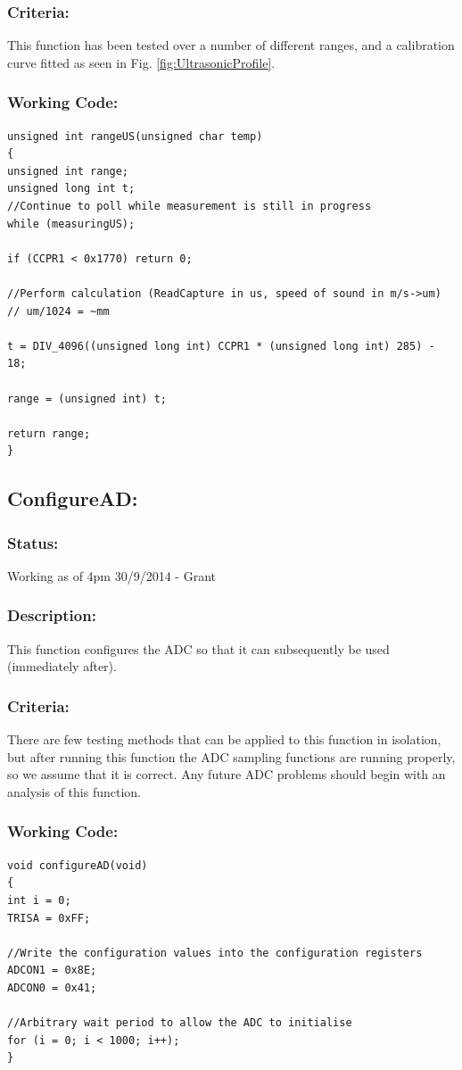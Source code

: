 \documentclass[]{report}
\begin{document}
\subsubsection{Criteria:}
This function has been tested over a number of different ranges, and a calibration curve fitted as seen in Fig. \ref{fig:UltrasonicProfile}.

\subsubsection{Working Code:}
\begin{lstlisting}
unsigned int rangeUS(unsigned char temp)
{
unsigned int range;
unsigned long int t;
//Continue to poll while measurement is still in progress
while (measuringUS);

if (CCPR1 < 0x1770) return 0;

//Perform calculation (ReadCapture in us, speed of sound in m/s->um)
// um/1024 = ~mm

t = DIV_4096((unsigned long int) CCPR1 * (unsigned long int) 285) - 18;

range = (unsigned int) t;

return range;
}
\end{lstlisting}


\subsection{ConfigureAD:}
\subsubsection{Status:}
Working as of 4pm 30/9/2014 - Grant

\subsubsection{Description:}
This function configures the ADC so that it can subsequently be used (immediately after).

\subsubsection{Criteria:}
There are few testing methods that can be applied to this function in isolation, but after running this function the ADC sampling functions are running properly, so we assume that it is correct. Any future ADC problems should begin with an analysis of this function.

\subsubsection{Working Code:}
\begin{lstlisting}
void configureAD(void)
{
int i = 0;
TRISA = 0xFF;

//Write the configuration values into the configuration registers
ADCON1 = 0x8E;
ADCON0 = 0x41;

//Arbitrary wait period to allow the ADC to initialise
for (i = 0; i < 1000; i++);
}
\end{lstlisting}
\end{document}
